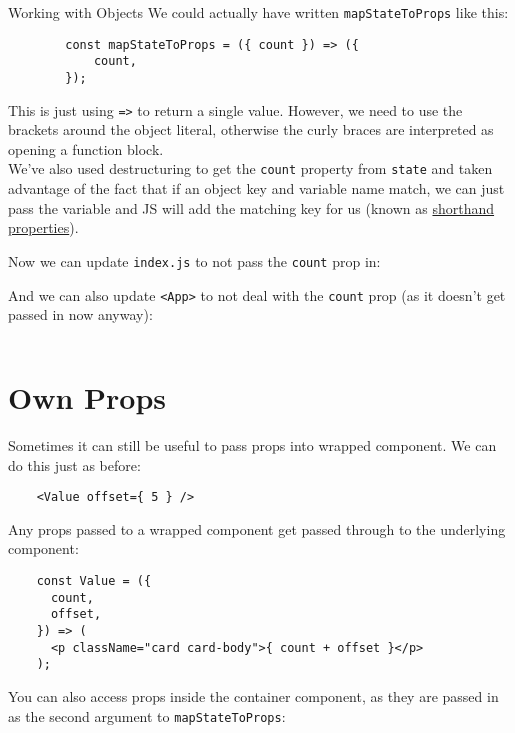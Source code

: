 \begin{infobox}{Working with Objects}
    We could actually have written \texttt{mapStateToProps} like this:

    \begin{verbatim}
        const mapStateToProps = ({ count }) => ({
            count,
        });
    \end{verbatim}

    This is just using \texttt{=>} to return a single value. However, we need to use the brackets around the object literal, otherwise the curly braces are interpreted as opening a function block.
    \\

    We've also used destructuring to get the \texttt{count} property from \texttt{state} and taken advantage of the fact that if an object key and variable name match, we can just pass the variable and JS will add the matching key for us (known as \href{https://ariya.io/2013/02/es6-and-object-literal-property-value-shorthand}{shorthand properties}).
\end{infobox}

Now we can update \texttt{index.js} to not pass the \texttt{count} prop in:


And we can also update \texttt{<App>} to not deal with the \texttt{count} prop (as it doesn't get passed in now anyway):

\inputminted{jsx}{02/figures/02/06-App.jsx}


\section{Own Props}

Sometimes it can still be useful to pass props into wrapped component. We can do this just as before:

\begin{verbatim}
    <Value offset={ 5 } />
\end{verbatim}

Any props passed to a wrapped component get passed through to the underlying component:

\begin{verbatim}
    const Value = ({
      count,
      offset,
    }) => (
      <p className="card card-body">{ count + offset }</p>
    );
\end{verbatim}

You can also access props inside the container component, as they are passed in as the second argument to \texttt{mapStateToProps}:

